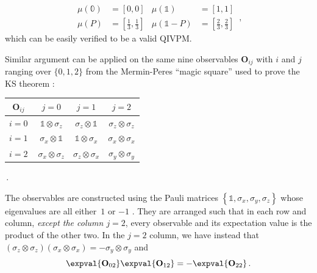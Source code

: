 \documentclass[english,reprint, aps, prl,superscriptaddress, showpacs,
showkeys, longbibliography, amsmath, amssymb, floatfix]{revtex4-1}
\theoremstyle{plain}
\theoremstyle{definition}
\newcommand{\imposs}{\ensuremath{\left[0,0\right]}}
\newcommand{\necess}{\ensuremath{\left[1,1\right]}}
\begin{document}
\begin{equation}
\begin{aligned}\mu\left(\mathbb{0}\right) & =\imposs & \mu\left(\mathbb{1}\right) & =\necess\\
\mu\left(P\right) & =\left[\tfrac{1}{3},\tfrac{1}{3}\right] & \mu\left(\mathbb{1}-P\right) & =\left[\tfrac{2}{3},\tfrac{2}{3}\right]
\end{aligned}
\,,
\end{equation}
which can be easily verified to be a valid QIVPM.

Similar argument can be applied on the same nine observables $\mathbf{O}_{ij}$
with $i$ and $j$ ranging over $\{0,1,2\}$ from the Mermin-Peres
``magic square'' used to prove the KS theorem \cite{Mermin1990Simple,peres1995quantum,Griffiths2003}:


{\renewcommand{\arraystretch}{2}%
\begin{center} 
\begin{tabular}{r|@{\quad}c@{\quad}|@{\quad}c@{\quad}|@{\quad}c@{\quad}|} 
$\mathbf{O}_{ij}$~ & $j=0$ & $j=1$ & $j=2$ \\ 
\hline  
$i=0~$ & $\mathbb{1}\otimes\sigma_{z}$  & $\sigma_{z}\otimes\mathbb{1}$  & $\sigma_{z}\otimes\sigma_{z}$ \tabularnewline 
\hline  
$i=1~$ & $\sigma_{x}\otimes\mathbb{1}$  & $\mathbb{1}\otimes\sigma_{x}$  & $\sigma_{x}\otimes\sigma_{x}$ \tabularnewline 
\hline  
$i=2~$ & $\sigma_{x}\otimes\sigma_{z}$  & $\sigma_{z}\otimes\sigma_{x}$  & $\sigma_{y}\otimes\sigma_{y}$ \tabularnewline 
\hline  
\end{tabular}\,.
\par\end{center} 
}

\noindent The observables are constructed using the Pauli matrices
$\left\{ \mathbb{1},\sigma_{x},\sigma_{y},\sigma_{z}\right\} $ whose
eigenvalues are all either~$1$ or $-1$ \cite{Redhead1987-REDINA,544199,Griffiths2003,Jaeger2007,Mermin2007}.
They are arranged such that in each row and column, \emph{except the
column $j=2$}, every observable and its expectation value is the
product of the other two. In the $j=2$ column, we have instead that
$\left(\sigma_{z}\otimes\sigma_{z}\right)\left(\sigma_{x}\otimes\sigma_{x}\right)=-\sigma_{y}\otimes\sigma_{y}$
and 
\begin{equation}
\expval{\mathbf{O}_{02}}\expval{\mathbf{O}_{12}}=-\expval{\mathbf{O}_{22}}\,.\label{eq:j_2_expectation_value}
\end{equation}
\end{document}
